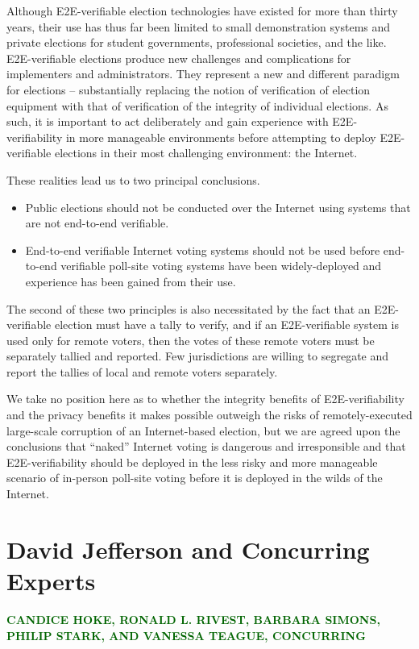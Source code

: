 Although E2E-verifiable election technologies have existed for more
than thirty years, their use has thus far been limited to small
demonstration systems and private elections for student governments,
professional societies, and the like.  E2E-verifiable elections
produce new challenges and complications for implementers and
administrators.  They represent a new and different paradigm for
elections – substantially replacing the notion of verification of
election equipment with that of verification of the integrity of
individual elections.  As such, it is important to act deliberately
and gain experience with E2E-verifiability in more manageable
environments before attempting to deploy E2E-verifiable elections in
their most challenging environment:  the Internet.

These realities lead us to two principal conclusions.

\begin{itemize}
\item Public elections should not be conducted over the Internet
using systems that are not end-to-end verifiable.

\item End-to-end verifiable Internet voting systems should not be
used before end-to-end verifiable poll-site voting systems have been
widely-deployed and experience has been gained from their use.
\end{itemize}

The second of these two principles is also necessitated by the fact
that an E2E-verifiable election must have a tally to verify, and if an
E2E-verifiable system is used only for remote voters, then the votes
of these remote voters must be separately tallied and reported.  Few
jurisdictions are willing to segregate and report the tallies of local
and remote voters separately. 

We take no position here as to whether the integrity benefits of
E2E-verifiability and the privacy benefits it makes possible outweigh
the risks of remotely-executed large-scale corruption of an
Internet-based election, but we are agreed upon the conclusions that
“naked” Internet voting is dangerous and irresponsible and that
E2E-verifiability should be deployed in the less risky and more
manageable scenario of in-person poll-site voting before it is
deployed in the wilds of the Internet.

\section{David Jefferson and Concurring Experts}
{\Large\sffamily\bfseries\textcolor{DarkGreen}{\MakeUppercase{Candice
      Hoke, Ronald L. Rivest, Barbara Simons, Philip Stark, and
      Vanessa Teague, Concurring}}}

